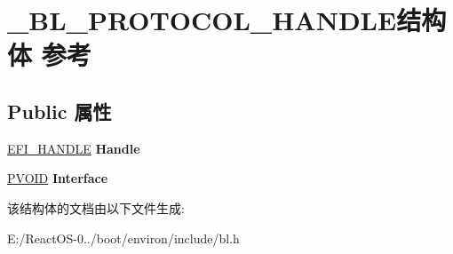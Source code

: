 \hypertarget{struct___b_l___p_r_o_t_o_c_o_l___h_a_n_d_l_e}{}\section{\+\_\+\+B\+L\+\_\+\+P\+R\+O\+T\+O\+C\+O\+L\+\_\+\+H\+A\+N\+D\+L\+E结构体 参考}
\label{struct___b_l___p_r_o_t_o_c_o_l___h_a_n_d_l_e}
\subsection*{Public 属性}
\begin{DoxyCompactItemize}
\item 
\mbox{\label{struct___b_l___p_r_o_t_o_c_o_l___h_a_n_d_l_e_a9797d399afa30db3545090121b2a8c2d}} 
\hyperlink{_uefi_base_type_8h_af943d518ce8a229e7e51ce3fed0e3122}{E\+F\+I\+\_\+\+H\+A\+N\+D\+LE} {\bfseries Handle}
\item 
\mbox{\label{struct___b_l___p_r_o_t_o_c_o_l___h_a_n_d_l_e_a88f924aa129d8e2a54d12111f9766ec5}} 
\hyperlink{interfacevoid}{P\+V\+O\+ID} {\bfseries Interface}
\end{DoxyCompactItemize}


该结构体的文档由以下文件生成\+:\begin{DoxyCompactItemize}
\item 
E\+:/\+React\+O\+S-\/0../boot/environ/include/bl.\+h\end{DoxyCompactItemize}

